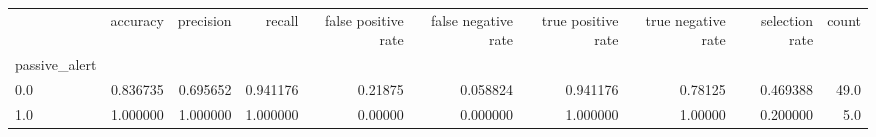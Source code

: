 \begin{tabular}{lrrrrrrrrr}
\toprule
{} &  accuracy &  precision &    recall &  false positive rate &  false negative rate &  true positive rate &  true negative rate &  selection rate &  count \\
passive\_alert &           &            &           &                      &                      &                     &                     &                 &        \\
\midrule
0.0           &  0.836735 &   0.695652 &  0.941176 &              0.21875 &             0.058824 &            0.941176 &             0.78125 &        0.469388 &   49.0 \\
1.0           &  1.000000 &   1.000000 &  1.000000 &              0.00000 &             0.000000 &            1.000000 &             1.00000 &        0.200000 &    5.0 \\
\bottomrule
\end{tabular}
